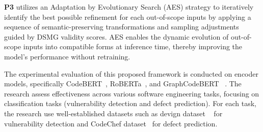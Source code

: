 
\textbf{P3} utilizes an Adaptation by Evolutionary Search (AES) strategy to iteratively identify the best possible refinement for each out-of-scope inputs by applying a sequence of semantic-preserving transformations and sampling adjustments guided by DSMG validity scores. AES enables the dynamic evolution of out-of-scope inputs into compatible forms at inference time, thereby improving the model's performance without retraining.


The experimental evaluation of this proposed framework is conducted on encoder models, specifically CodeBERT~\cite{fengCodeBERTPreTrainedModel2020}, RoBERTa~\cite{Liu2019RoBERTa}, and GraphCodeBERT~\cite{guo2021graphcodebert} . The research assess  effectiveness across various software engineering tasks, focusing on classification tasks (vulnerability detection and defect prediction). For each task, the research use well-established datasets such as devign dataset ~\cite{zhou2019devign} for vulnerability detection and CodeChef dataset~\cite{phan2017conv} for defect prediction. 


